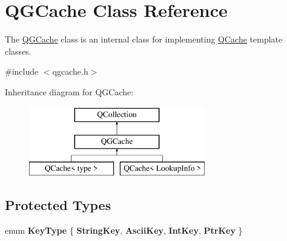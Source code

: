 \hypertarget{class_q_g_cache}{}\section{Q\+G\+Cache Class Reference}
\label{class_q_g_cache}


The \mbox{\hyperlink{class_q_g_cache}{Q\+G\+Cache}} class is an internal class for implementing \mbox{\hyperlink{class_q_cache}{Q\+Cache}} template classes.  




{\ttfamily \#include $<$qgcache.\+h$>$}

Inheritance diagram for Q\+G\+Cache\+:\begin{figure}[H]
\begin{center}
\leavevmode
\includegraphics[height=3.000000cm]{class_q_g_cache}
\end{center}
\end{figure}
\subsection*{Protected Types}
\begin{DoxyCompactItemize}
\item 
\mbox{\label{class_q_g_cache_a1dcb303ef4795be3117374c386c5574a}} 
enum {\bfseries Key\+Type} \{ {\bfseries String\+Key}, 
{\bfseries Ascii\+Key}, 
{\bfseries Int\+Key}, 
{\bfseries Ptr\+Key}
 \}
\end{DoxyCompactItemize}
